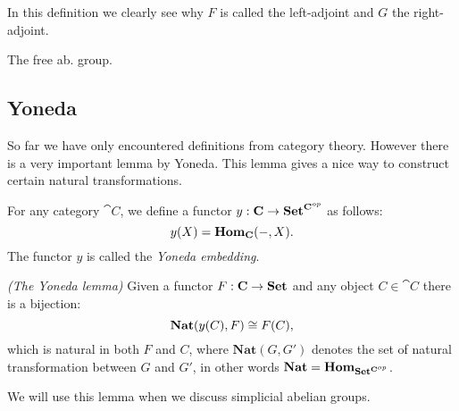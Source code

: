 In this definition we clearly see why $F$ is called the left-adjoint and $G$ the right-adjoint.

\begin{example}
	The free ab. group. 
\end{example}

\subsection{Yoneda}
So far we have only encountered definitions from category theory. However there is a very important lemma by Yoneda. This lemma gives a nice way to construct certain natural transformations.

\begin{definition}
	For any category $\cat{C}$, we define a functor $y:\mathbf{C} \to \mathbf{Set}^{\mathbf{C}^{op}}$ as follows:
	$$ y(X) = \mathbf{Hom}_{\mathbf{C}}(-, X). $$
	The functor $y$ is called the \emph{Yoneda embedding}.
\end{definition}

\begin{lemma}\emph{(The Yoneda lemma)}
	Given a functor $F: \mathbf{C} \to \mathbf{Set}$ and any object $C \in \cat{C}$ there is a bijection:
	$$ \mathbf{Nat}(y(C), F) \cong F(C), $$
	which is natural in both $F$ and $C$, where $\mathbf{Nat}(G, G')$ denotes the set of natural transformation between $G$ and $G'$, in other words $\mathbf{Nat} = \mathbf{Hom}_{\mathbf{Set}^{\mathbf{C}^{op}}}$.
\end{lemma}

We will use this lemma when we discuss simplicial abelian groups.